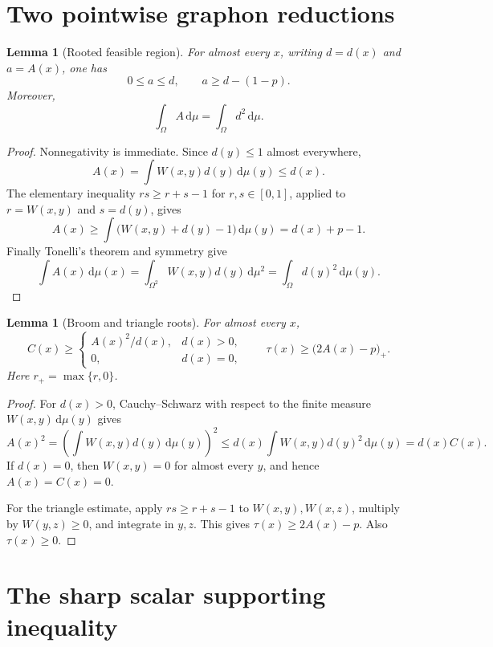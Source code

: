 \documentclass[11pt]{article}
\newtheorem{lemma}[theorem]{Lemma}
\newcommand{\dd}{\,\mathrm d}
\begin{document}
\section{Two pointwise graphon reductions}

\begin{lemma}[Rooted feasible region]\label{lem:region}
For almost every $x$, writing $d=d(x)$ and $a=A(x)$, one has
\[
 0\leq a\leq d,
 \qquad
 a\geq d-(1-p).
\]
Moreover,
\[
 \int_\Omega A\dd\mu=\int_\Omega d^2\dd\mu.
\]
\end{lemma}

\begin{proof}
Nonnegativity is immediate.  Since $d(y)\leq1$ almost everywhere,
\[
 A(x)=\int W(x,y)d(y)\dd\mu(y)\leq d(x).
\]
The elementary inequality $rs\geq r+s-1$ for $r,s\in[0,1]$, applied to
$r=W(x,y)$ and $s=d(y)$, gives
\[
 A(x)\geq\int\bigl(W(x,y)+d(y)-1\bigr)\dd\mu(y)
 =d(x)+p-1.
\]
Finally Tonelli's theorem and symmetry give
\[
 \int A(x)\dd\mu(x)
 =\int_{\Omega^2}W(x,y)d(y)\dd\mu^2
 =\int_\Omega d(y)^2\dd\mu(y).
\]
\end{proof}

\begin{lemma}[Broom and triangle roots]\label{lem:pointwise}
For almost every $x$,
\[
 C(x)\geq
 \begin{cases}
 A(x)^2/d(x),&d(x)>0,\\
 0,&d(x)=0,
 \end{cases}
 \qquad
 \tau(x)\geq\bigl(2A(x)-p\bigr)_+.
\]
Here $r_+=\max\{r,0\}$.
\end{lemma}

\begin{proof}
For $d(x)>0$, Cauchy--Schwarz with respect to the finite measure
$W(x,y)\dd\mu(y)$ gives
\[
 A(x)^2
 =\left(\int W(x,y)d(y)\dd\mu(y)\right)^2
 \leq d(x)\int W(x,y)d(y)^2\dd\mu(y)
 =d(x)C(x).
\]
If $d(x)=0$, then $W(x,y)=0$ for almost every $y$, and hence
$A(x)=C(x)=0$.

For the triangle estimate, apply $rs\geq r+s-1$ to
$W(x,y),W(x,z)$, multiply by $W(y,z)\geq0$, and integrate in $y,z$.
This gives $\tau(x)\geq2A(x)-p$.  Also $\tau(x)\geq0$.
\end{proof}


\section{The sharp scalar supporting inequality}
\end{document}
